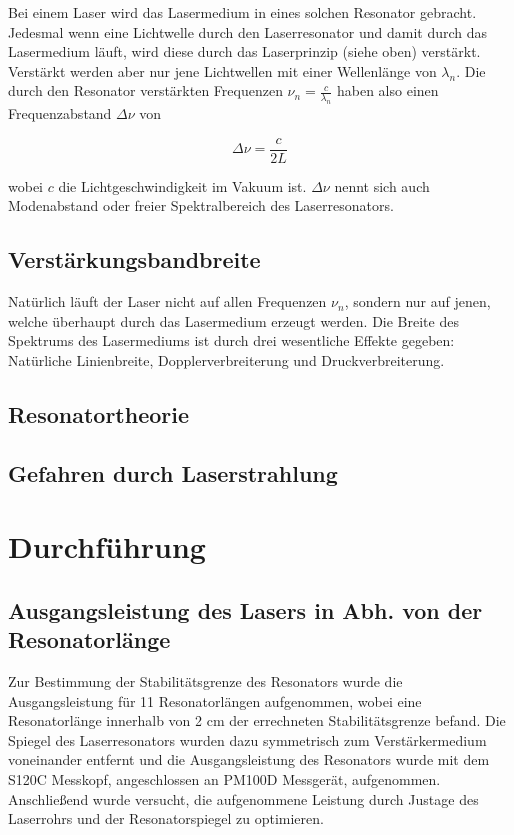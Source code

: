 \documentclass[bigchapter,colorback,accentcolor=tud4b,linedtoc,11pt]{tudreport}
\numberwithin{equation}{subsection}
\begin{document}
Bei einem Laser wird das Lasermedium in eines solchen Resonator gebracht. Jedesmal wenn eine Lichtwelle durch den Laserresonator und damit durch das Lasermedium läuft, wird diese durch das Laserprinzip (siehe oben) verstärkt. Verstärkt werden aber nur jene Lichtwellen mit einer Wellenlänge von \(\lambda_n\). Die durch den Resonator verstärkten Frequenzen \(\nu_n = \frac{c}{\lambda_n}\) haben also einen Frequenzabstand \(\Delta\nu\) von

$$ \Delta\nu = \frac{c}{2L} $$

wobei $c$ die Lichtgeschwindigkeit im Vakuum ist. \(\Delta\nu\) nennt sich auch Modenabstand oder freier Spektralbereich des Laserresonators.

\section{Verstärkungsbandbreite}

Natürlich läuft der Laser nicht auf allen Frequenzen $\nu_n$, sondern nur auf jenen, welche überhaupt durch das Lasermedium erzeugt werden. Die Breite des Spektrums des Lasermediums ist durch drei wesentliche Effekte gegeben: Natürliche Linienbreite, Dopplerverbreiterung und Druckverbreiterung.




\section{Resonatortheorie}

\section{Gefahren durch Laserstrahlung}

\chapter{Durchführung}
\section{Ausgangsleistung des Lasers in Abh. von der Resonatorlänge}
Zur Bestimmung der Stabilitätsgrenze des Resonators wurde die Ausgangsleistung für 11 Resonatorlängen aufgenommen, wobei eine Resonatorlänge innerhalb von 2 cm der errechneten Stabilitätsgrenze befand.
Die Spiegel des Laserresonators wurden dazu symmetrisch zum Verstärkermedium voneinander entfernt und die Ausgangsleistung des Resonators wurde mit dem S120C Messkopf, angeschlossen an PM100D Messgerät, aufgenommen. Anschließend wurde versucht, die aufgenommene Leistung durch Justage des Laserrohrs und der Resonatorspiegel zu optimieren.
\end{document}
